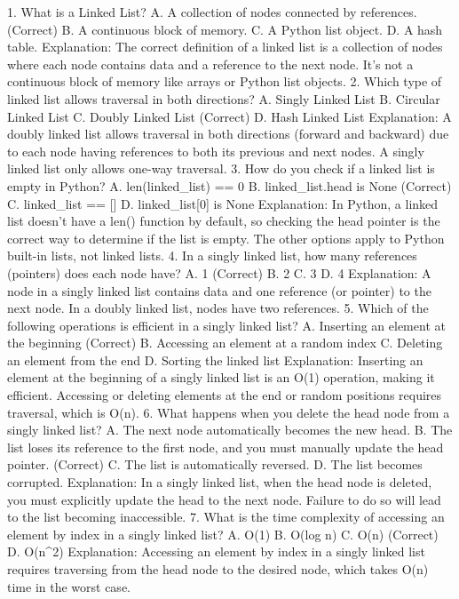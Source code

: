 1. What is a Linked List?
A. A collection of nodes connected by references. (Correct)
B. A continuous block of memory.
C. A Python list object.
D. A hash table.
Explanation: The correct definition of a linked list is a collection of nodes where each node contains data and a reference to the next node. It's not a continuous block of memory like arrays or Python list objects.
2. Which type of linked list allows traversal in both directions?
A. Singly Linked List
B. Circular Linked List
C. Doubly Linked List (Correct)
D. Hash Linked List
Explanation: A doubly linked list allows traversal in both directions (forward and backward) due to each node having references to both its previous and next nodes. A singly linked list only allows one-way traversal.
3. How do you check if a linked list is empty in Python?
A. len(linked_list) == 0
B. linked_list.head is None (Correct)
C. linked_list == []
D. linked_list[0] is None
Explanation: In Python, a linked list doesn't have a len() function by default, so checking the head pointer is the correct way to determine if the list is empty. The other options apply to Python built-in lists, not linked lists.
4. In a singly linked list, how many references (pointers) does each node have?
A. 1 (Correct)
B. 2
C. 3
D. 4
Explanation: A node in a singly linked list contains data and one reference (or pointer) to the next node. In a doubly linked list, nodes have two references.
5. Which of the following operations is efficient in a singly linked list?
A. Inserting an element at the beginning (Correct)
B. Accessing an element at a random index
C. Deleting an element from the end
D. Sorting the linked list
Explanation: Inserting an element at the beginning of a singly linked list is an O(1) operation, making it efficient. Accessing or deleting elements at the end or random positions requires traversal, which is O(n).
6. What happens when you delete the head node from a singly linked list?
A. The next node automatically becomes the new head.
B. The list loses its reference to the first node, and you must manually update the head pointer. (Correct)
C. The list is automatically reversed.
D. The list becomes corrupted.
Explanation: In a singly linked list, when the head node is deleted, you must explicitly update the head to the next node. Failure to do so will lead to the list becoming inaccessible.
7. What is the time complexity of accessing an element by index in a singly linked list?
A. O(1)
B. O(log n)
C. O(n) (Correct)
D. O(n^2)
Explanation: Accessing an element by index in a singly linked list requires traversing from the head node to the desired node, which takes O(n) time in the worst case.
